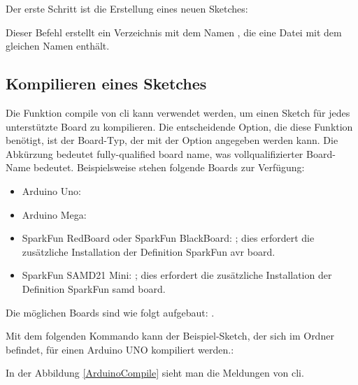Der erste Schritt ist die Erstellung eines neuen Sketches:

\medskip


\medskip

Dieser Befehl erstellt ein Verzeichnis mit dem Namen , die eine Datei mit dem gleichen Namen enthält.

\subsection{Kompilieren eines Sketches}

Die Funktion \glqq compile\grqq{} von \ac{cli} kann verwendet werden, um einen Sketch für jedes unterstützte Board zu kompilieren. Die entscheidende Option, die diese Funktion benötigt, ist der Board-Typ, der mit der Option  angegeben werden kann. Die Abkürzung  bedeutet \glqq fully-qualified board name\grqq, was \glqq vollqualifizierter Board-Name\grqq{} bedeutet. Beispielsweise stehen folgende Boards zur Verfügung:


\begin{itemize}
    \item Arduino Uno: 
    \item Arduino Mega: 
    \item SparkFun RedBoard oder SparkFun BlackBoard: ; dies erfordert die zusätzliche Installation der Definition \glqq SparkFun avr board\grqq.
    \item  SparkFun SAMD21 Mini: ; dies erfordert die zusätzliche Installation der Definition \glqq SparkFun samd board\grqq.
\end{itemize}

Die möglichen Boards sind wie folgt aufgebaut:  .

\bigskip

Mit dem folgenden Kommando kann der Beispiel-Sketch, der sich im Ordner   befindet, für einen Arduino UNO kompiliert werden.:

\medskip


\medskip

In der Abbildung \ref{ArduinoCompile} sieht man die Meldungen von \ac{cli}.

